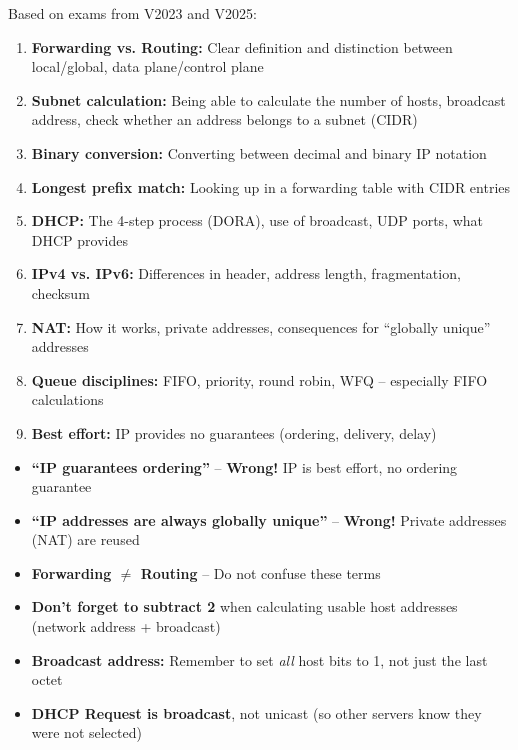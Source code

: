 \begin{exambox}
Based on exams from V2023 and V2025:

\begin{enumerate}[noitemsep]
    \item \textbf{Forwarding vs. Routing:} Clear definition and distinction between local/global, data plane/control plane
    \item \textbf{Subnet calculation:} Being able to calculate the number of hosts, broadcast address, check whether an address belongs to a subnet (CIDR)
    \item \textbf{Binary conversion:} Converting between decimal and binary IP notation
    \item \textbf{Longest prefix match:} Looking up in a forwarding table with CIDR entries
    \item \textbf{DHCP:} The 4-step process (DORA), use of broadcast, UDP ports, what DHCP provides
    \item \textbf{IPv4 vs. IPv6:} Differences in header, address length, fragmentation, checksum
    \item \textbf{NAT:} How it works, private addresses, consequences for ``globally unique'' addresses
    \item \textbf{Queue disciplines:} FIFO, priority, round robin, WFQ -- especially FIFO calculations
    \item \textbf{Best effort:} IP provides no guarantees (ordering, delivery, delay)
\end{enumerate}
\end{exambox}

\begin{warnbox}
\begin{itemize}[noitemsep]
    \item \textbf{``IP guarantees ordering''} -- \textbf{Wrong!} IP is best effort, no ordering guarantee
    \item \textbf{``IP addresses are always globally unique''} -- \textbf{Wrong!} Private addresses (NAT) are reused
    \item \textbf{Forwarding $\neq$ Routing} -- Do not confuse these terms
    \item \textbf{Don't forget to subtract 2} when calculating usable host addresses (network address + broadcast)
    \item \textbf{Broadcast address:} Remember to set \emph{all} host bits to 1, not just the last octet
    \item \textbf{DHCP Request is broadcast}, not unicast (so other servers know they were not selected)
\end{itemize}
\end{warnbox}

